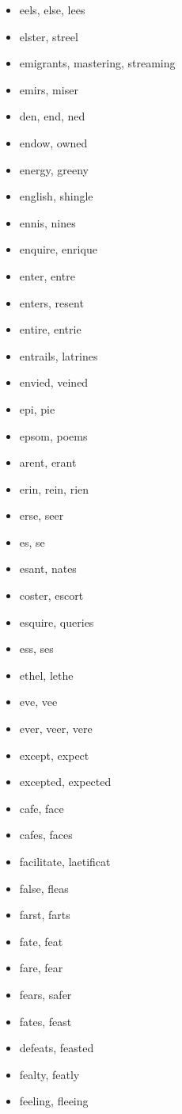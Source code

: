 \documentclass[a4wide,11pt]{report}
\begin{document}
\begin{itemize}
  \item eels, else, lees
  \item elster, streel
  \item emigrants, mastering, streaming
  \item emirs, miser
  \item den, end, ned
  \item endow, owned
  \item energy, greeny
  \item english, shingle
  \item ennis, nines
  \item enquire, enrique
  \item enter, entre
  \item enters, resent
  \item entire, entrie
  \item entrails, latrines
  \item envied, veined
  \item epi, pie
  \item epsom, poems
  \item arent, erant
  \item erin, rein, rien
  \item erse, seer
  \item es, se
  \item esant, nates
  \item coster, escort
  \item esquire, queries
  \item ess, ses
  \item ethel, lethe
  \item eve, vee
  \item ever, veer, vere
  \item except, expect
  \item excepted, expected
  \item cafe, face
  \item cafes, faces
  \item facilitate, laetificat
  \item false, fleas
  \item farst, farts
  \item fate, feat
  \item fare, fear
  \item fears, safer
  \item fates, feast
  \item defeats, feasted
  \item fealty, featly
  \item feeling, fleeing

\end{itemize}
\end{document}
